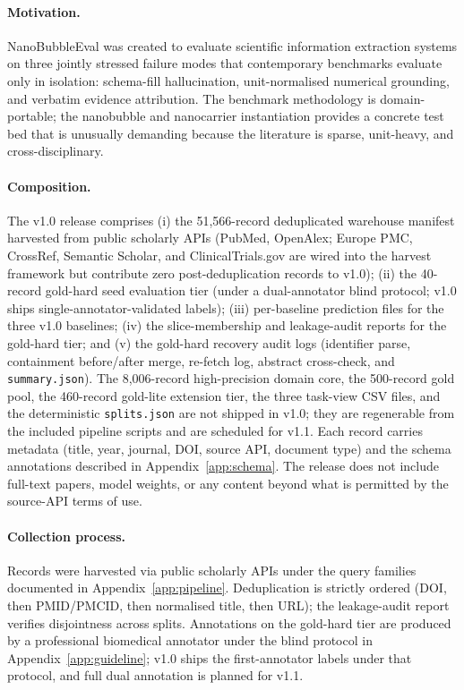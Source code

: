 \documentclass{article}
\begin{document}
\paragraph{Motivation.}
NanoBubbleEval was created to evaluate scientific information
extraction systems on three jointly stressed failure modes that
contemporary benchmarks evaluate only in isolation: schema-fill
hallucination, unit-normalised numerical grounding, and verbatim
evidence attribution. The benchmark methodology is domain-portable;
the nanobubble and nanocarrier instantiation provides a concrete
test bed that is unusually demanding because the literature is
sparse, unit-heavy, and cross-disciplinary.

\paragraph{Composition.}
The v1.0 release comprises (i) the 51{,}566-record deduplicated
warehouse manifest harvested from public scholarly APIs (PubMed,
OpenAlex; Europe PMC, CrossRef, Semantic Scholar, and
ClinicalTrials.gov are wired into the harvest framework but contribute
zero post-deduplication records to v1.0); (ii) the 40-record gold-hard
seed evaluation tier (under a dual-annotator blind protocol; v1.0
ships single-annotator-validated labels); (iii) per-baseline
prediction files for the three v1.0 baselines; (iv) the
slice-membership and leakage-audit reports for the gold-hard tier;
and (v) the gold-hard recovery audit logs (identifier parse,
containment before/after merge, re-fetch log, abstract cross-check,
and \texttt{summary.json}). The 8{,}006-record high-precision domain
core, the 500-record gold pool, the 460-record gold-lite extension
tier, the three task-view CSV files, and the deterministic
\texttt{splits.json} are not shipped in v1.0; they are regenerable
from the included pipeline scripts and are scheduled for v1.1.
Each record carries metadata (title, year, journal, DOI, source API,
document type) and the schema annotations described in
Appendix~\ref{app:schema}. The release does not include full-text
papers, model weights, or any content beyond what is permitted by the
source-API terms of use.

\paragraph{Collection process.}
Records were harvested via public scholarly APIs under the query
families documented in Appendix~\ref{app:pipeline}. Deduplication is
strictly ordered (DOI, then PMID/PMCID, then normalised title, then
URL); the leakage-audit report verifies disjointness across splits.
Annotations on the gold-hard tier are produced by a professional
biomedical annotator under the blind protocol in
Appendix~\ref{app:guideline}; v1.0 ships the first-annotator labels
under that protocol, and full dual annotation is planned for v1.1.
\end{document}
